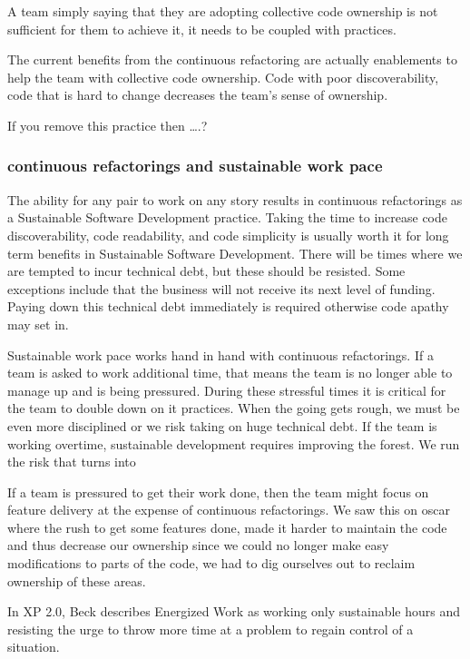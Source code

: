 A team simply saying that they are adopting collective code ownership is not sufficient for them to achieve it, it needs to be coupled with practices.

The current benefits from the continuous refactoring are actually enablements to help the team with collective code ownership. Code with poor discoverability, code that is hard to change decreases the team's sense of ownership.

If you remove this practice then ….?

\subsubsection{continuous refactorings and sustainable work pace}
The ability for any pair to work on any story results in continuous refactorings as a Sustainable Software Development practice. Taking the time to increase code discoverability, code readability, and code simplicity is usually worth it for long term benefits in Sustainable Software Development. There will be times where we are tempted to incur technical debt, but these should be resisted. Some exceptions include that the business will not receive its next level of funding. Paying down this technical debt immediately is required otherwise code apathy may set in. 

Sustainable work pace works hand in hand with continuous refactorings. If a team is asked to work additional time, that means the team is no longer able to manage up and is being pressured. During these stressful times it is critical for the team to double down on it practices. When the going gets rough, we must be even more disciplined or we risk taking on huge technical debt. If the team is working overtime, sustainable development requires improving the forest. We run the risk that  turns into 

If a team is pressured to get their work done, then the team might focus on feature delivery at the expense of continuous refactorings. We saw this on oscar where the rush to get some features done, made it harder to maintain the code and thus decrease our ownership since we could no longer make easy modifications to parts of the code, we had to dig ourselves out to reclaim ownership of these areas.

In XP 2.0, Beck describes Energized Work as working only sustainable hours and resisting the urge to throw more time at a problem to regain control of a situation.  

